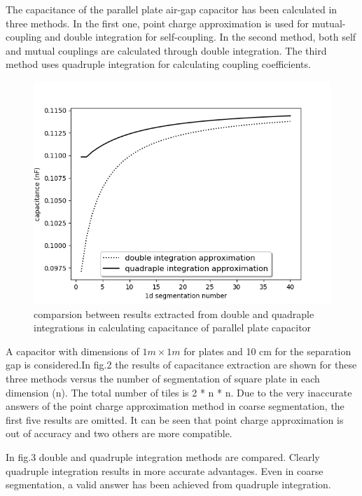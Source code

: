 \documentclass[final,5p,times,twocolumn]{elsarticle}
\begin{document}
The capacitance of the parallel plate air-gap capacitor has been calculated in three methods. In the first one, point charge approximation is used for mutual-coupling and double integration for self-coupling. In the second method, both self and mutual couplings are calculated through double integration. The third method uses quadruple integration for calculating coupling coefficients. 

\begin {figure}[h]
	\center
	\includegraphics[width=\linewidth]	{saeedvshitoshi.png}
	\caption{comparsion between results extracted from double and quadraple integrations in calculating capacitance of parallel plate capacitor}
\end{figure}
A capacitor with dimensions of $1m \times 1m $ for plates and 10 cm for the separation gap is considered.In fig.2 the results of capacitance extraction are shown for these three methods versus the number of segmentation of square plate in each dimension (n). The total number of tiles is 2 * n * n. Due to the very inaccurate answers of the point charge approximation method in coarse segmentation, the first five results are omitted. It can be seen that point charge approximation is out of accuracy and two others are more compatible. 


In fig.3 double and quadruple integration methods are compared. Clearly quadruple integration results in more accurate advantages. Even in coarse segmentation, a valid answer has been achieved from quadruple integration.
\end{document}
